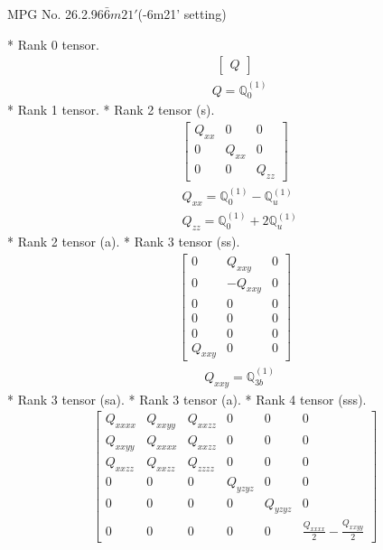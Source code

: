 \documentclass[fleqn,8pt,landscape]{jsarticle}
\begin{document}
\setcounter{MaxMatrixCols}{32}

\renewcommand{\tablename}{Table~}
\renewcommand{\figurename}{Figure~}
\begin{center}
\LARGE
MPG No. 26.2.96\quad$\bar{6}m21'$\quad(-6m21' setting)
\end{center}
* Rank 0 tensor.
\begin{align*}
\begin{bmatrix} Q \end{bmatrix}
\end{align*}
\begin{align*}
& Q = \mathbb{Q}_{0}^{(1)}
\end{align*}
* Rank 1 tensor.
* Rank 2 tensor (s).
\begin{align*}
\begin{bmatrix} Q_{xx} & 0 & 0 \\ 0 & Q_{xx} & 0 \\ 0 & 0 & Q_{zz} \end{bmatrix}
\end{align*}
\begin{align*}
& Q_{xx} = \mathbb{Q}_{0}^{(1)} - \mathbb{Q}_{u}^{(1)} \\
& Q_{zz} = \mathbb{Q}_{0}^{(1)} + 2 \mathbb{Q}_{u}^{(1)}
\end{align*}
* Rank 2 tensor (a).
* Rank 3 tensor (ss).
\begin{align*}
\begin{bmatrix} 0 & Q_{xxy} & 0 \\ 0 & - Q_{xxy} & 0 \\ 0 & 0 & 0 \\ 0 & 0 & 0 \\ 0 & 0 & 0 \\ Q_{xxy} & 0 & 0 \end{bmatrix}
\end{align*}
\begin{align*}
& Q_{xxy} = \mathbb{Q}_{3b}^{(1)}
\end{align*}
* Rank 3 tensor (sa).
* Rank 3 tensor (a).
* Rank 4 tensor (sss).
\begin{align*}
\begin{bmatrix} Q_{xxxx} & Q_{xxyy} & Q_{xxzz} & 0 & 0 & 0 \\ Q_{xxyy} & Q_{xxxx} & Q_{xxzz} & 0 & 0 & 0 \\ Q_{xxzz} & Q_{xxzz} & Q_{zzzz} & 0 & 0 & 0 \\ 0 & 0 & 0 & Q_{yzyz} & 0 & 0 \\ 0 & 0 & 0 & 0 & Q_{yzyz} & 0 \\ 0 & 0 & 0 & 0 & 0 & \frac{Q_{xxxx}}{2} - \frac{Q_{xxyy}}{2} \end{bmatrix}
\end{align*}
\end{document}

